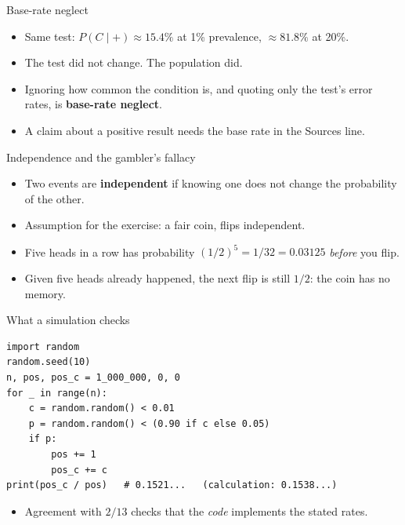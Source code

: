 \documentclass[aspectratio=169,10pt]{beamer}
\begin{document}
\begin{frame}{Base-rate neglect}
\begin{itemize}
\item Same test: $P(C\mid +)\approx 15.4\%$ at 1\% prevalence, $\approx 81.8\%$ at 20\%.
\item The test did not change. The population did.
\item Ignoring how common the condition is, and quoting only the test's error rates, is \textbf{base-rate neglect}.
\item A claim about a positive result needs the base rate in the Sources line.
\end{itemize}
\end{frame}

\begin{frame}{Independence and the gambler's fallacy}
\begin{itemize}
\item Two events are \textbf{independent} if knowing one does not change the probability of the other.
\item Assumption for the exercise: a fair coin, flips independent.
\item Five heads in a row has probability $(1/2)^5 = 1/32 = 0.03125$ \emph{before} you flip.
\item Given five heads already happened, the next flip is still $1/2$: the coin has no memory.
\end{itemize}
\end{frame}

\begin{frame}[fragile]{What a simulation checks}
\begin{lstlisting}
import random
random.seed(10)
n, pos, pos_c = 1_000_000, 0, 0
for _ in range(n):
    c = random.random() < 0.01
    p = random.random() < (0.90 if c else 0.05)
    if p:
        pos += 1
        pos_c += c
print(pos_c / pos)   # 0.1521...   (calculation: 0.1538...)
\end{lstlisting}
\begin{itemize}
\item Agreement with $2/13$ checks that the \emph{code} implements the stated rates.
\end{itemize}
\end{frame}
\end{document}
